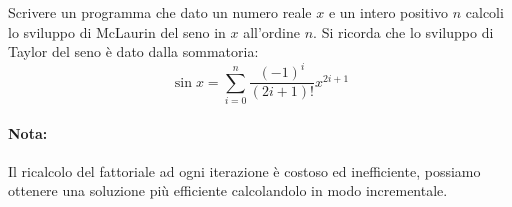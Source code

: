 \begin{Exercise}[label={ex:taylor}]
  	Scrivere un programma che dato un numero reale $x$ e un intero positivo $n$ calcoli lo sviluppo di McLaurin del seno in $x$ all'ordine $n$. Si ricorda che lo sviluppo di Taylor del seno \`e dato dalla sommatoria:
  	$$ \sin{x} = \sum^{n}_{i=0} \frac{(-1)^i}{(2i+1)!} x^{2i+1}$$
\end{Exercise}

\begin{Answer}[ref={ex:taylor}]
  
  \paragraph{Nota: } Il ricalcolo del fattoriale ad ogni iterazione è costoso ed inefficiente, possiamo ottenere una soluzione più efficiente calcolandolo in modo incrementale.  
  
\end{Answer}
